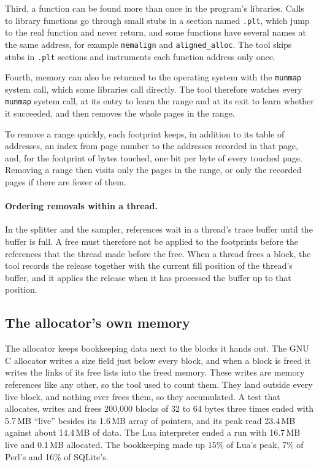 \documentclass[11pt]{article}
\begin{document}
Third, a function can be found more than once in the program's libraries. Calls to library functions go through small stubs in a section named \texttt{.plt}, which jump to the real function and never return, and some functions have several names at the same address, for example \texttt{memalign} and \texttt{aligned\_alloc}. The tool skips stubs in \texttt{.plt} sections and instruments each function address only once.

Fourth, memory can also be returned to the operating system with the \texttt{munmap} system call, which some libraries call directly. The tool therefore watches every \texttt{munmap} system call, at its entry to learn the range and at its exit to learn whether it succeeded, and then removes the whole pages in the range.

To remove a range quickly, each footprint keeps, in addition to its table of addresses, an index from page number to the addresses recorded in that page, and, for the footprint of bytes touched, one bit per byte of every touched page. Removing a range then visits only the pages in the range, or only the recorded pages if there are fewer of them.

\paragraph{Ordering removals within a thread.}
In the splitter and the sampler, references wait in a thread's trace buffer until the buffer is full. A free must therefore not be applied to the footprints before the references that the thread made before the free. When a thread frees a block, the tool records the release together with the current fill position of the thread's buffer, and it applies the release when it has processed the buffer up to that position.

\subsection{The allocator's own memory}
\label{sec:allocator}

The allocator keeps bookkeeping data next to the blocks it hands out. The GNU C allocator writes a size field just below every block, and when a block is freed it writes the links of its free lists into the freed memory. These writes are memory references like any other, so the tool used to count them. They land outside every live block, and nothing ever frees them, so they accumulated. A test that allocates, writes and frees 200{,}000 blocks of 32 to 64 bytes three times ended with 5.7\,MB ``live'' besides its 1.6\,MB array of pointers, and its peak read 23.4\,MB against about 14.4\,MB of data. The Lua interpreter ended a run with 16.7\,MB live and 0.1\,MB allocated. The bookkeeping made up 15\% of Lua's peak, 7\% of Perl's and 16\% of SQLite's.
\end{document}
